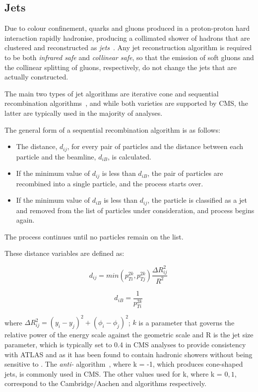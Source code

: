 \subsection{Jets}\label{subsec:objReco-jets}
Due to colour confinement, quarks and gluons produced in a proton-proton hard interaction rapidly hadronise, producing a collimated shower of hadrons that are clustered and reconstructed as \emph{jets}~\cite{Salam:2009jx}.
Any jet reconstruction algorithm is required to be both \emph{infrared safe} and \emph{collinear safe}, \ie so that the emission of soft gluons and the collinear splitting of gluons, respectively, do not change the jets that are actually constructed.

The main two types of jet algorithms are iterative cone and sequential recombination algorithms~\cite{Salam:2009jx}, and while both varieties are supported by CMS, the latter are typically used in the majority of analyses.

The general form of a sequential recombination algorithm is as follows:
\begin{itemize}
\item The distance, $d_{ij}$, for every pair of particles and the distance between each particle and the beamline, $d_{iB}$, is calculated.
\item If the minimum value of $d_{ij}$ is less than $d_{iB}$, the pair of particles are recombined into a single particle, and the process starts over.
\item If the minimum value of $d_{iB}$ is less than $d_{ij}$, the particle is classified as a jet and removed from the list of particles under consideration, and process begins again.
\end{itemize}

The process continues until no particles remain on the list.

These distance variables are defined as:

\begin{equation}
d_{ij} = min(p^{2k}_{Ti},p^{2k}_{Tj}) \frac{\Delta R^{2}_{ij}}{R^{2}} \;
\label{eq:jetAlgo1}
\end{equation}

\begin{equation}
d_{iB} = \frac{1}{p^{2k}_{Ti}} \;
\label{eq:jetAlgo2}
\end{equation}

where $\Delta R^{2}_{ij} = (y_{i} - y_{j})^{2} + (\phi_{i} - \phi_{j})^{2}$; $k$  is a parameter that governs the relative power of the energy scale against the geometric scale and R is the jet size parameter, which is typically set to 0.4 in CMS analyses to provide consistency with ATLAS and as it has been found to contain hadronic showers without being sensitive to \PU.
The \emph{anti-\kt} algorithm~\cite{Cacciari:2008gp}, where k = -1, which produces cone-shaped jets, is commonly used in CMS.
The other values used for k, where k = $0,1$, correspond to the Cambridge/Aachen and \kt algorithms respectively.

